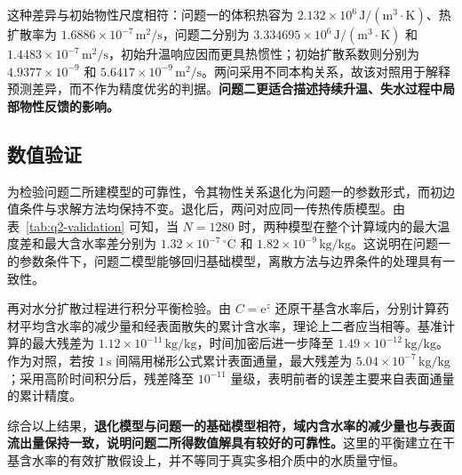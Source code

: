 这种差异与初始物性尺度相符：问题一的体积热容为 $2.132\times10^{6}\,\mathrm{J/(m^3\cdot K)}$、热扩散率为 $1.6886\times10^{-7}\,\mathrm{m^2/s}$，问题二分别为 $3.334695\times10^{6}\,\mathrm{J/(m^3\cdot K)}$ 和 $1.4483\times10^{-7}\,\mathrm{m^2/s}$，初始升温响应因而更具热惯性；初始扩散系数则分别为 $4.9377\times10^{-9}$ 和 $5.6417\times10^{-9}\,\mathrm{m^2/s}$。两问采用不同本构关系，故该对照用于解释预测差异，而不作为精度优劣的判据。{\heiti\bfseries 问题二更适合描述持续升温、失水过程中局部物性反馈的影响。}

\subsection{数值验证}

为检验问题二所建模型的可靠性，令其物性关系退化为问题一的参数形式，而初边值条件与求解方法均保持不变。退化后，两问对应同一传热传质模型。由表~\ref{tab:q2-validation} 可知，当 $N=1280$ 时，两种模型在整个计算域内的最大温度差和最大含水率差分别为 $1.32\times10^{-7}\,{}^\circ\mathrm{C}$ 和 $1.82\times10^{-9}\,\mathrm{kg/kg}$。这说明在问题一的参数条件下，问题二模型能够回归基础模型，离散方法与边界条件的处理具有一致性。

再对水分扩散过程进行积分平衡检验。由 $C=\mathrm e^z$ 还原干基含水率后，分别计算药材平均含水率的减少量和经表面散失的累计含水率，理论上二者应当相等。基准计算的最大残差为 $1.12\times10^{-11}\,\mathrm{kg/kg}$，时间加密后进一步降至 $1.49\times10^{-12}\,\mathrm{kg/kg}$。作为对照，若按 $1\,\mathrm{s}$ 间隔用梯形公式累计表面通量，最大残差为 $5.04\times10^{-7}\,\mathrm{kg/kg}$；采用高阶时间积分后，残差降至 $10^{-11}$ 量级，表明前者的误差主要来自表面通量的累计精度。



综合以上结果，{\heiti\bfseries 退化模型与问题一的基础模型相符，域内含水率的减少量也与表面流出量保持一致，说明问题二所得数值解具有较好的可靠性。}这里的平衡建立在干基含水率的有效扩散假设上，并不等同于真实多相介质中的水质量守恒。

\par{}
